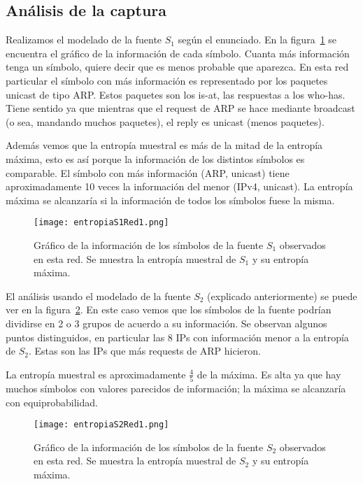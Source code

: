 \subsection{Análisis de la captura}

Realizamos el modelado de la fuente $S_1$ según el enunciado. En la figura~\ref{entropias1_1} se encuentra el gráfico de la información de cada símbolo. Cuanta más información tenga un símbolo, quiere decir que es menos probable que aparezca. En esta red particular el símbolo con más información es representado por los paquetes unicast de tipo ARP. Estos paquetes son los is-at, las respuestas a los who-has. Tiene sentido ya que mientras que el request de ARP se hace mediante broadcast (o sea, mandando muchos paquetes), el reply es unicast (menos paquetes).

Además vemos que la entropía muestral es más de la mitad de la entropía máxima, esto es así porque la información de los distintos símbolos es comparable. El símbolo con más información (ARP, unicast) tiene aproximadamente 10 veces la información del menor (IPv4, unicast). La entropía máxima se alcanzaría si la información de todos los símbolos fuese la misma.

\begin{figure}[H]
\centering
\texttt{[image: entropiaS1Red1.png]}
\caption{Gráfico de la información de los símbolos de la fuente $S_1$ observados en esta red. Se muestra la entropía muestral de $S_1$ y su entropía máxima.}
\label{entropias1_1}
\end{figure}

El análisis usando el modelado de la fuente $S_2$ (explicado anteriormente) se puede ver en la figura~\ref{entropias2_1}. En este caso vemos que los símbolos de la fuente podrían dividirse en 2 o 3 grupos de acuerdo a su información. Se observan algunos puntos distinguidos, en particular las 8 IPs con información menor a la entropía de $S_2$. Estas son las IPs que más requests de ARP hicieron. 

La entropía muestral es aproximadamente $\frac{4}{5}$ de la máxima. Es alta ya que hay muchos símbolos con valores parecidos de información; la máxima se alcanzaría con equiprobabilidad.

\begin{figure}[H]
\centering
\texttt{[image: entropiaS2Red1.png]}
\caption{Gráfico de la información de los símbolos de la fuente $S_2$ observados en esta red. Se muestra la entropía muestral de $S_2$ y su entropía máxima.}
\label{entropias2_1}
\end{figure}

